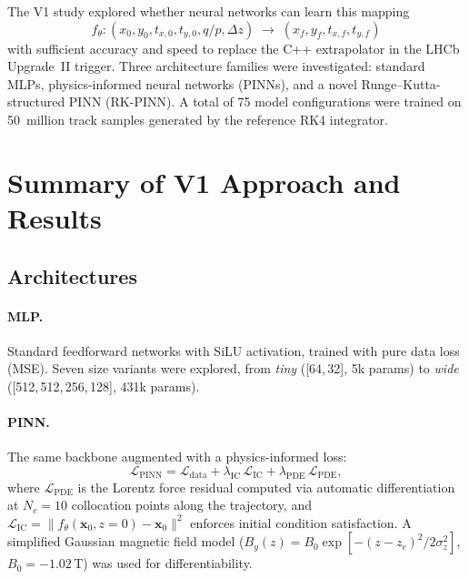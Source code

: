 \documentclass[12pt,a4paper]{article}
\newcommand{\vb}[1]{\bm{#1}}
\begin{document}
The V1 study explored whether neural networks can learn this mapping
\begin{equation}
f_\theta: (x_0, y_0, t_{x,0}, t_{y,0}, q/p, \Delta z) \;\longrightarrow\; (x_f, y_f, t_{x,f}, t_{y,f})
\label{eq:nn_mapping}
\end{equation}
with sufficient accuracy and speed to replace the C++ extrapolator in the LHCb Upgrade~II trigger. Three architecture families were investigated: standard MLPs, physics-informed neural networks (PINNs), and a novel Runge--Kutta-structured PINN (RK-PINN). A total of 75 model configurations were trained on 50~million track samples generated by the reference RK4 integrator.

\section{Summary of V1 Approach and Results}
\label{sec:v1_summary}

\subsection{Architectures}

\paragraph{MLP.} Standard feedforward networks with SiLU activation, trained with pure data loss (MSE). Seven size variants were explored, from \textit{tiny} ([64,\,32], 5k params) to \textit{wide} ([512,\,512,\,256,\,128], 431k params).

\paragraph{PINN.} The same backbone augmented with a physics-informed loss:
\begin{equation}
\mathcal{L}_{\text{PINN}} = \mathcal{L}_{\text{data}} + \lambda_{\text{IC}}\,\mathcal{L}_{\text{IC}} + \lambda_{\text{PDE}}\,\mathcal{L}_{\text{PDE}},
\label{eq:pinn_loss}
\end{equation}
where $\mathcal{L}_{\text{PDE}}$ is the Lorentz force residual computed via automatic differentiation at $N_c = 10$ collocation points along the trajectory, and $\mathcal{L}_{\text{IC}} = \|f_\theta(\vb{x}_0, z{=}0) - \vb{x}_0\|^2$ enforces initial condition satisfaction. A simplified Gaussian magnetic field model ($B_y(z) = B_0 \exp[-(z-z_c)^2 / 2\sigma_z^2]$, $B_0 = -1.02$\,T) was used for differentiability.
\end{document}
